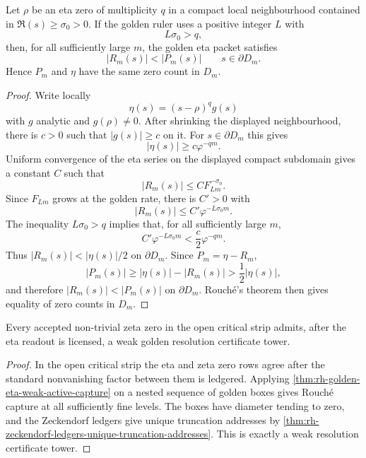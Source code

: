 \begin{theorem}
\label{thm:rh-golden-eta-weak-active-capture}
Let $\rho$ be an eta zero of multiplicity $q$ in a compact local
neighbourhood contained in $\Re(s)\ge\sigma_0>0$. If the golden ruler
uses a positive integer $L$ with
$$
L\sigma_0>q,
$$
then, for all sufficiently large $m$, the golden eta packet satisfies
$$
|R_m(s)|<|P_m(s)|
\qquad
s\in\partial D_m.
$$
Hence $P_m$ and $\eta$ have the same zero count in $D_m$.
\end{theorem}

\begin{proof}
Write locally
$$
\eta(s)=(s-\rho)^qg(s)
$$
with $g$ analytic and $g(\rho)\ne0$. After shrinking the displayed
neighbourhood, there is $c>0$ such that $|g(s)|\ge c$ on it. For
$s\in\partial D_m$ this gives
$$
|\eta(s)|\ge c\varphi^{-qm}.
$$
Uniform convergence of the eta series on the displayed compact
subdomain gives a constant $C$ such that
$$
|R_m(s)|\le C F_{Lm}^{-\sigma_0}.
$$
Since $F_{Lm}$ grows at the golden rate, there is $C'>0$ with
$$
|R_m(s)|\le C'\varphi^{-L\sigma_0 m}.
$$
The inequality $L\sigma_0>q$ implies that, for all sufficiently large
$m$,
$$
C'\varphi^{-L\sigma_0 m}<\frac{c}{2}\varphi^{-qm}.
$$
Thus $|R_m(s)|<|\eta(s)|/2$ on $\partial D_m$. Since
$P_m=\eta-R_m$,
$$
|P_m(s)|\ge|\eta(s)|-|R_m(s)|>\frac12|\eta(s)|,
$$
and therefore $|R_m(s)|<|P_m(s)|$ on $\partial D_m$. Rouch\'e's theorem
then gives equality of zero counts in $D_m$.
\end{proof}

\begin{corollary}
\label{cor:rh-golden-rulers-supply-weak-resolution-towers}
Every accepted non-trivial zeta zero in the open critical strip admits,
after the eta readout is licensed, a weak golden resolution certificate
tower.
\end{corollary}

\begin{proof}
In the open critical strip the eta and zeta zero rows agree after the
standard nonvanishing factor between them is ledgered. Applying
\autoref{thm:rh-golden-eta-weak-active-capture} on a nested sequence of
golden boxes gives Rouch\'e capture at all sufficiently fine levels.
The boxes have diameter tending to zero, and the Zeckendorf ledgers give
unique truncation addresses by
\autoref{thm:rh-zeckendorf-ledgers-unique-truncation-addresses}. This is
exactly a weak resolution certificate tower.
\end{proof}

